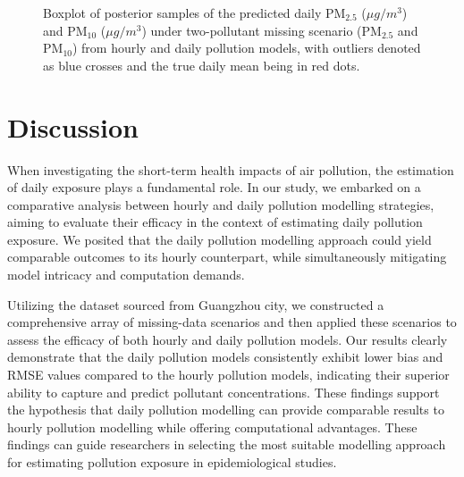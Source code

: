 \documentclass[
  12,
]{article}
\begin{document}
\begin{figure}[H]
\caption{Boxplot of posterior samples of the predicted daily PM$_{2.5}$ ($\mu g/m^3$) and PM$_{10}$ ($\mu g/m^3$) under two-pollutant missing scenario (PM$_{2.5}$ and PM$_{10}$) from hourly and daily pollution models, with outliers denoted as blue crosses and the true daily mean being in red dots.}\label{fig:pm25pm10missing}
\end{figure}

\hypertarget{discussion}{%
\section{Discussion}\label{discussion}}

When investigating the short-term health impacts of air pollution, the
estimation of daily exposure plays a fundamental role. In our study, we
embarked on a comparative analysis between hourly and daily pollution
modelling strategies, aiming to evaluate their efficacy in the context
of estimating daily pollution exposure. We posited that the daily
pollution modelling approach could yield comparable outcomes to its
hourly counterpart, while simultaneously mitigating model intricacy and
computation demands.

Utilizing the dataset sourced from Guangzhou city, we constructed a
comprehensive array of missing-data scenarios and then applied these
scenarios to assess the efficacy of both hourly and daily pollution
models. Our results clearly demonstrate that the daily pollution models
consistently exhibit lower bias and RMSE values compared to the hourly
pollution models, indicating their superior ability to capture and
predict pollutant concentrations. These findings support the hypothesis
that daily pollution modelling can provide comparable results to hourly
pollution modelling while offering computational advantages. These
findings can guide researchers in selecting the most suitable modelling
approach for estimating pollution exposure in epidemiological studies.
\end{document}
